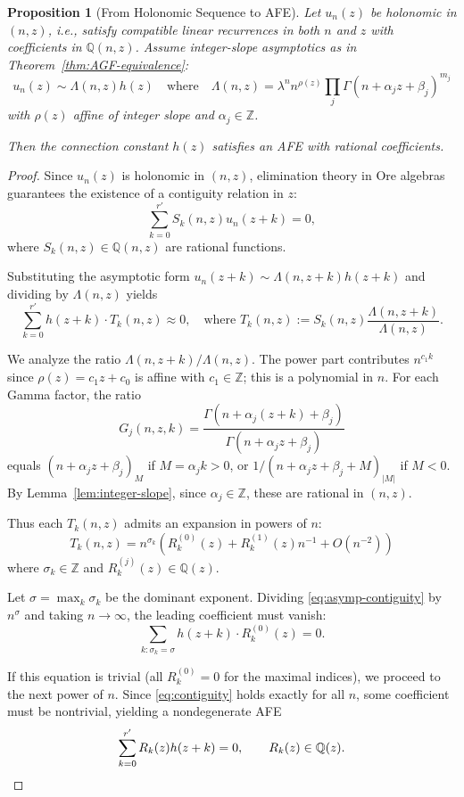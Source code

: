 \documentclass[11pt,reqno]{amsart}
\newtheorem{proposition}[theorem]{Proposition}
\theoremstyle{definition}
\newcommand{\Z}{\mathbb{Z}}
\newcommand{\Q}{\mathbb{Q}}
\numberwithin{equation}{section}
\begin{document}
\begin{proposition}[From Holonomic Sequence to AFE]\label{prop:prec-to-afe}
Let $u_n(z)$ be holonomic in $(n,z)$, i.e., satisfy compatible linear recurrences in both $n$ and $z$ with coefficients in $\Q(n,z)$. Assume integer-slope asymptotics as in Theorem~\ref{thm:AGF-equivalence}:
\begin{equation*}
u_n(z) \sim \Lambda(n,z)h(z) \quad \text{where} \quad 
\Lambda(n,z) = \lambda^n n^{\rho(z)} \prod_j \Gamma(n+\alpha_j z+\beta_j)^{m_j}
\end{equation*}
with $\rho(z)$ affine of integer slope and $\alpha_j \in \Z$.

Then the connection constant $h(z)$ satisfies an AFE with rational 
coefficients.
\end{proposition}

\begin{proof}
Since $u_n(z)$ is holonomic in $(n,z)$, elimination theory in Ore algebras \cite{ChyzakSalvy1998} guarantees the existence of a contiguity relation in $z$:
\begin{equation}\label{eq:contiguity}
\sum_{k=0}^{r'} S_k(n,z) u_n(z+k) = 0,
\end{equation}
where $S_k(n,z) \in \Q(n,z)$ are rational functions.

Substituting the asymptotic form $u_n(z+k) \sim \Lambda(n,z+k)h(z+k)$ and dividing by $\Lambda(n,z)$ yields
\begin{equation}\label{eq:asymp-contiguity}
\sum_{k=0}^{r'} h(z+k) \cdot T_k(n,z) \approx 0, \quad \text{where } T_k(n,z) := S_k(n,z) \frac{\Lambda(n,z+k)}{\Lambda(n,z)}.
\end{equation}

We analyze the ratio $\Lambda(n,z+k)/\Lambda(n,z)$. The power part contributes $n^{c_1 k}$ since $\rho(z) = c_1 z + c_0$ is affine with $c_1 \in \Z$; this is a polynomial in $n$. For each Gamma factor, the ratio
$$G_j(n,z,k) = \frac{\Gamma(n+\alpha_j(z+k)+\beta_j)}{\Gamma(n+\alpha_j z+\beta_j)}$$
equals $(n+\alpha_j z+\beta_j)_M$ if $M = \alpha_j k > 0$, or $1/(n+\alpha_j z+\beta_j+M)_{|M|}$ if $M < 0$. By Lemma~\ref{lem:integer-slope}, since $\alpha_j \in \Z$, these are rational in $(n,z)$.

Thus each $T_k(n,z)$ admits an expansion in powers of $n$:
$$T_k(n,z) = n^{\sigma_k} \left( R_k^{(0)}(z) + R_k^{(1)}(z) n^{-1} + O(n^{-2}) \right)$$
where $\sigma_k \in \Z$ and $R_k^{(j)}(z) \in \Q(z)$.

Let $\sigma = \max_k \sigma_k$ be the dominant exponent. Dividing \eqref{eq:asymp-contiguity} by $n^\sigma$ and taking $n \to \infty$, the leading coefficient must vanish:
$$ \sum_{k : \sigma_k = \sigma} h(z+k) \cdot R_k^{(0)}(z) = 0. $$

If this equation is trivial (all $R_k^{(0)} = 0$ for the maximal indices), we proceed to the next power of $n$. Since \eqref{eq:contiguity} holds exactly for all $n$, some coefficient must be nontrivial, yielding a nondegenerate AFE
$$\sum_{k=0}^{r'} R_k(z) h(z+k) = 0, \qquad R_k(z) \in \Q(z). \qedhere$$
\end{proof}
\end{document}
